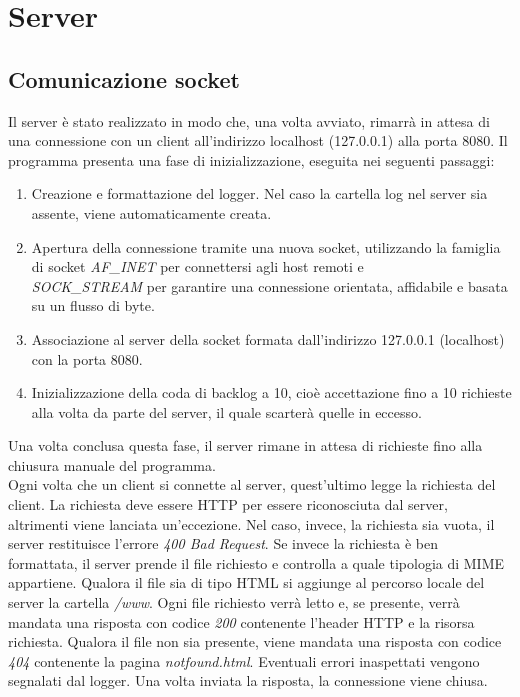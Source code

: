 \documentclass[a4paper,12pt]{report}
\begin{document}
\section{Server}
\subsection{Comunicazione socket}

Il server è stato realizzato in modo che, una volta avviato, rimarrà in attesa di una connessione con un client all'indirizzo localhost (127.0.0.1) alla porta 8080. Il programma presenta una fase di inizializzazione, eseguita nei seguenti passaggi:

\begin{enumerate}
    \item Creazione e formattazione del logger. Nel caso la cartella log nel server sia assente, viene automaticamente creata.
    \item Apertura della connessione tramite una nuova socket, utilizzando la famiglia di socket \textit{AF\_INET} per connettersi agli host remoti e \\\textit{SOCK\_STREAM} per garantire una connessione orientata, affidabile e basata su un flusso di byte.
    \item Associazione al server della socket formata dall'indirizzo 127.0.0.1 (localhost) con la porta 8080.
    \item Inizializzazione della coda di backlog a 10, cioè accettazione fino a 10 richieste alla volta da parte del server, il quale scarterà quelle in eccesso.
\end{enumerate}
%
Una volta conclusa questa fase, il server rimane in attesa di richieste fino alla chiusura manuale del programma.  
\\Ogni volta che un client si connette al server, quest'ultimo legge la richiesta del client. La richiesta deve essere HTTP per essere riconosciuta dal server, altrimenti viene lanciata un'eccezione. Nel caso, invece, la richiesta sia vuota, il server restituisce l'errore \textit{400 Bad Request}. Se invece la richiesta è ben formattata, il server prende il file richiesto e controlla a quale tipologia di MIME appartiene. Qualora il file sia di tipo HTML si aggiunge al percorso locale del server la cartella \textit{/www}. Ogni file richiesto verrà letto e, se presente, verrà mandata una risposta con codice \textit{200} contenente l'header HTTP e la risorsa richiesta. Qualora il file non sia presente, viene mandata una risposta con codice \textit{404} contenente la pagina \textit{notfound.html}. Eventuali errori inaspettati vengono segnalati dal logger. Una volta inviata la risposta, la connessione viene chiusa.
\end{document}
